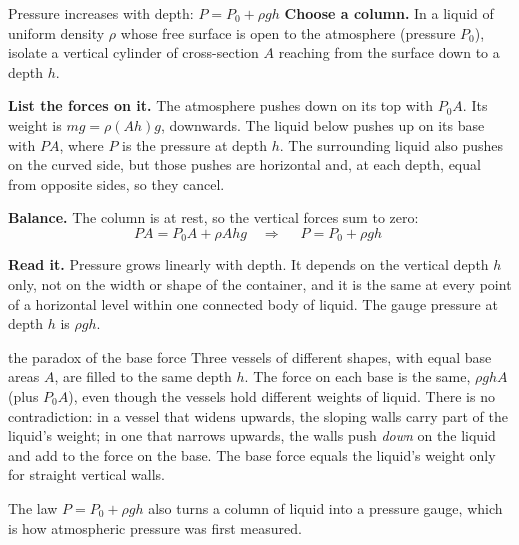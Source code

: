 \begin{derivbox}{Pressure increases with depth: $P=P_0+\rho gh$}
 \textbf{Choose a column.} In a liquid of uniform density $\rho$ whose free surface is open to the
atmosphere (pressure $P_0$), isolate a vertical cylinder of cross-section $A$ reaching from the surface down
to a depth $h$.

 \textbf{List the forces on it.} The atmosphere pushes down on its top with $P_0A$. Its weight is
$mg=\rho(Ah)g$, downwards. The liquid below pushes up on its base with $PA$, where $P$ is the pressure at
depth $h$. The surrounding liquid also pushes on the curved side, but those pushes are horizontal and, at
each depth, equal from opposite sides, so they cancel.

 \textbf{Balance.} The column is at rest, so the vertical forces sum to zero:
\[
PA=P_0A+\rho Ahg\quad\Longrightarrow\quad\boxed{\;P=P_0+\rho gh\;}
\]

 \textbf{Read it.} Pressure grows linearly with depth. It depends on the vertical depth $h$ only,
not on the width or shape of the container, and it is the same at every point of a horizontal level within
one connected body of liquid. The gauge pressure at depth $h$ is $\rho gh$.
\end{derivbox}


\begin{trapbox}{the paradox of the base force}
Three vessels of different shapes, with equal base areas $A$, are filled to the same depth $h$. The force
on each base is the same, $\rho ghA$ (plus $P_0A$), even though the vessels hold different weights of
liquid. There is no contradiction: in a vessel that widens upwards, the sloping walls carry part of the
liquid's weight; in one that narrows upwards, the walls push \emph{down} on the liquid and add to the force
on the base. The base force equals the liquid's weight only for straight vertical walls.
\end{trapbox}

The law $P=P_0+\rho gh$ also turns a column of liquid into a pressure gauge, which is how atmospheric
pressure was first measured.

